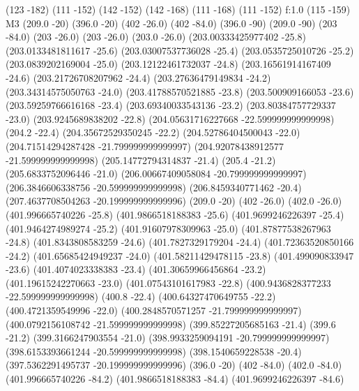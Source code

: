 {\htext (123 -182) {\matrixfontselect \color{white}{0}}
\move (111 -152)
\lvec (142 -152)
\lvec (142 -168)
\lvec (111 -168)
\lvec (111 -152)
\lfill f:1.0
\htext (115 -159) {\matrixfontselect M3}
\move (209.0 -20)
\lvec (396.0 -20)
\move (402 -26.0)
\lvec (402 -84.0)
\move (396.0 -90)
\lvec (209.0 -90)
\move (203 -84.0)
\lvec (203 -26.0)
\move (203 -26.0)
\lvec (203.0 -26.0)
\lvec (203.00333425977402 -25.8)
\lvec (203.0133481811617 -25.6)
\lvec (203.03007537736028 -25.4)
\lvec (203.0535725010726 -25.2)
\lvec (203.0839202169004 -25.0)
\lvec (203.12122461732037 -24.8)
\lvec (203.16561914167409 -24.6)
\lvec (203.21726708207962 -24.4)
\lvec (203.27636479149834 -24.2)
\lvec (203.34314575050763 -24.0)
\lvec (203.41788570521885 -23.8)
\lvec (203.500909166053 -23.6)
\lvec (203.59259766616168 -23.4)
\lvec (203.69340033543136 -23.2)
\lvec (203.80384757729337 -23.0)
\lvec (203.9245689838202 -22.8)
\lvec (204.05631716227668 -22.599999999999998)
\lvec (204.2 -22.4)
\lvec (204.35672529350245 -22.2)
\lvec (204.52786404500043 -22.0)
\lvec (204.71514294287428 -21.799999999999997)
\lvec (204.92078438912577 -21.599999999999998)
\lvec (205.14772794314837 -21.4)
\lvec (205.4 -21.2)
\lvec (205.6833752096446 -21.0)
\lvec (206.00667409058084 -20.799999999999997)
\lvec (206.3846606338756 -20.599999999999998)
\lvec (206.8459340771462 -20.4)
\lvec (207.4637708504263 -20.199999999999996)
\lvec (209.0 -20)
\move (402 -26.0)
\lvec (402.0 -26.0)
\lvec (401.996665740226 -25.8)
\lvec (401.9866518188383 -25.6)
\lvec (401.9699246226397 -25.4)
\lvec (401.9464274989274 -25.2)
\lvec (401.91607978309963 -25.0)
\lvec (401.87877538267963 -24.8)
\lvec (401.8343808583259 -24.6)
\lvec (401.7827329179204 -24.4)
\lvec (401.72363520850166 -24.2)
\lvec (401.65685424949237 -24.0)
\lvec (401.58211429478115 -23.8)
\lvec (401.499090833947 -23.6)
\lvec (401.4074023338383 -23.4)
\lvec (401.30659966456864 -23.2)
\lvec (401.19615242270663 -23.0)
\lvec (401.07543101617983 -22.8)
\lvec (400.9436828377233 -22.599999999999998)
\lvec (400.8 -22.4)
\lvec (400.64327470649755 -22.2)
\lvec (400.4721359549996 -22.0)
\lvec (400.2848570571257 -21.799999999999997)
\lvec (400.0792156108742 -21.599999999999998)
\lvec (399.85227205685163 -21.4)
\lvec (399.6 -21.2)
\lvec (399.3166247903554 -21.0)
\lvec (398.9933259094191 -20.799999999999997)
\lvec (398.6153393661244 -20.599999999999998)
\lvec (398.1540659228538 -20.4)
\lvec (397.5362291495737 -20.199999999999996)
\lvec (396.0 -20)
\move (402 -84.0)
\lvec (402.0 -84.0)
\lvec (401.996665740226 -84.2)
\lvec (401.9866518188383 -84.4)
\lvec (401.9699246226397 -84.6)
}
